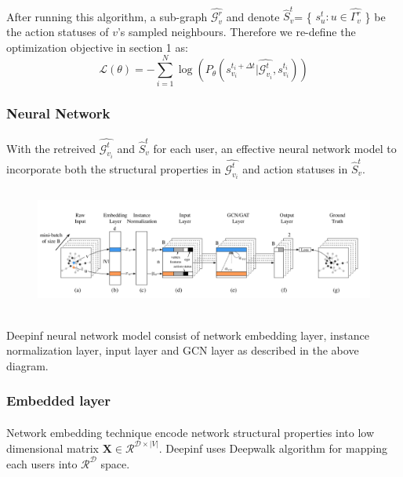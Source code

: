 \paragraph{} After running this algorithm, a sub-graph $\hat{\mathcal{G}_v^r}$ and denote $\hat{S}_v^t$=
\{ $s_u^t :u \in \hat{\Gamma_v^r}$ \} be the action statuses of $v$'s sampled neighbours. Therefore we re-define the optimization
objective in section 1 as:
\begin{equation}
    \mathcal{L}(\theta) = -\sum_{i=1}^N \log(P_{\theta}(s_{v_i}^{t_i+\Delta t}|\hat{\mathcal{G}_{v_i}^{t}},s_{v_i}^{t_i}))
\end{equation}
\subsubsection{Neural Network}
\paragraph{} With the retreived $\hat{\mathcal{G}_{v_i}^{t}}$ and $\hat{S}_v^t$ for each user, an effective
neural network model to incorporate both the structural properties in $\hat{\mathcal{G}_{v_i}^{t}}$ and action statuses in 
$\hat{S}_v^t$.
\begin{figure}
    \includegraphics[width=12cm,height=4cm]{tex/img/framework.png}
\end{figure}
\paragraph{} Deepinf neural network model consist of network embedding layer, instance normalization layer, input layer
and GCN layer as described in the above diagram.
\subsubsection{Embedded layer}
\paragraph{} Network embedding technique encode network structural properties into low dimensional matrix $\mathbf{X} \in
\mathcal{R}^{\mathcal{D} \times |V|}$. Deepinf uses Deepwalk algorithm for mapping each users into $\mathcal{R}^{\mathcal{D}}$
space.
